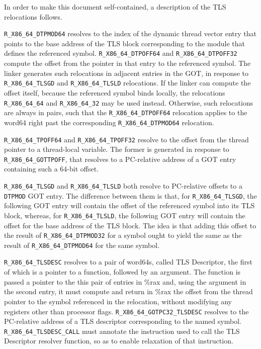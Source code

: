 In order to make this document self-contained, a description of the
TLS relocations follows.

\begin{sloppypar}
\texttt{R_X86_64_DTPMOD64} resolves to the index of the dynamic thread
vector entry that points to the base address of the TLS block
corresponding to the module that defines the referenced symbol.
\texttt{R_X86_64_DTPOFF64} and \texttt{R_X86_64_DTPOFF32} compute the
offset from the pointer in that entry to the referenced symbol.  The
linker generates such relocations in adjacent entries in the GOT, in
response to \texttt{R_X86_64_TLSGD} and \texttt{R_X86_64_TLSLD}
relocations.  If the linker can compute the offset itself, because the
referenced symbol binds locally, the relocations \texttt{R_X86_64_64} and \texttt{R_X86_64_32} may be used instead.
Otherwise, such relocations are always in pairs, such that the
\texttt{R_X86_64_DTPOFF64} relocation applies to the word64 right past the
corresponding \texttt{R_X86_64_DTPMOD64} relocation.
\end{sloppypar}

\texttt{R_X86_64_TPOFF64} and \texttt{R_X86_64_TPOFF32} resolve to the
offset from the thread pointer to a thread-local variable.  The former
is generated in response to \texttt{R_X86_64_GOTTPOFF}, that resolves
to a PC-relative address of a GOT entry containing such a 64-bit
offset.

\texttt{R_X86_64_TLSGD} and \texttt{R_X86_64_TLSLD} both resolve to
PC-relative offsets to a \texttt{DTPMOD} GOT entry.  The difference
between them is that, for \texttt{R_X86_64_TLSGD}, the following GOT entry will
contain the offset of the referenced symbol into its TLS block,
whereas, for \texttt{R_X86_64_TLSLD}, the following GOT entry will contain the
offset for the base address of the TLS block.  The idea is that adding
this offset to the result of \texttt{R_X86_64_DTPMOD32} for a symbol ought to
yield the same as the result of \texttt{R_X86_64_DTPMOD64} for the same symbol.

\texttt{R_X86_64_TLSDESC} resolves to a pair of word64s, called TLS
Descriptor, the first of which is a pointer to a function, followed by
an argument.  The function is passed a pointer to the this pair of
entries in \%rax and, using the argument in the second entry, it must
compute and return in \%rax the offset from the thread pointer to the
symbol referenced in the relocation, without modifying any registers
other than processor flags.  \texttt{R_X86_64_GOTPC32_TLSDESC}
resolves to the PC-relative address of a TLS descriptor corresponding
to the named symbol.  \texttt{R_X86_64_TLSDESC_CALL} must annotate the
instruction used to call the TLS Descriptor resolver function, so as
to enable relaxation of that instruction.

